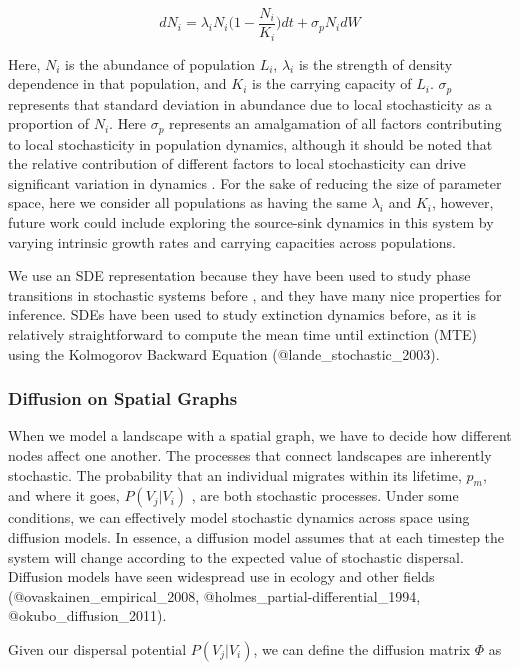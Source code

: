 \documentclass[]{article}
\begin{document}
\[dN_i=\lambda_i N_i \big(1 - \frac{N_i}{K_i}\big)dt+\sigma_pN_idW\]

Here, \(N_i\) is the abundance of population \(L_i\), \(\lambda_i\) is the
strength of density dependence in that population, and \(K_i\) is the
carrying capacity of \(L_i\). \(\sigma_p\) represents that standard
deviation in abundance due to local stochasticity as a proportion of
\(N_i\). Here \(\sigma_p\) represents an amalgamation of all factors
contributing to local stochasticity in population dynamics, although it
should be noted that the relative contribution of different factors to
local stochasticity can drive significant variation in dynamics
\cite{melbourne_extinction_2008}. For the sake of reducing the size of parameter
space, here we consider all populations as having the same \(\lambda_i\)
and \(K_i\), however, future work could include exploring the
source-sink dynamics in this system by varying intrinsic growth rates
and carrying capacities across populations.

We use an SDE representation because they have been used to study phase
transitions in stochastic systems before \cite{brock_early_2012, kuehn_mathematical_2011}, and they have many nice properties for inference. SDEs
have been used to study extinction dynamics before, as it is relatively
straightforward to compute the mean time until extinction (MTE) using
the Kolmogorov Backward Equation (@lande\_stochastic\_2003).

\hypertarget{diffusion-on-spatial-graphs}{%
\subsubsection{Diffusion on Spatial
Graphs}\label{diffusion-on-spatial-graphs}}

When we model a landscape with a spatial graph, we have to decide how
different nodes affect one another. The processes that connect
landscapes are inherently stochastic. The probability that an individual
migrates within its lifetime, \(p_m\), and where it goes, \(P(V_j|V_i)\)
, are both stochastic processes. Under some conditions, we can
effectively model stochastic dynamics across space using diffusion
models. In essence, a diffusion model assumes that at each timestep the
system will change according to the expected value of stochastic
dispersal. Diffusion models have seen widespread use in ecology and
other fields (@ovaskainen\_empirical\_2008,
@holmes\_partial-differential\_1994, @okubo\_diffusion\_2011).

Given our dispersal potential \(P(V_j|V_i)\), we can define the
diffusion matrix \(\Phi\) as
\end{document}
